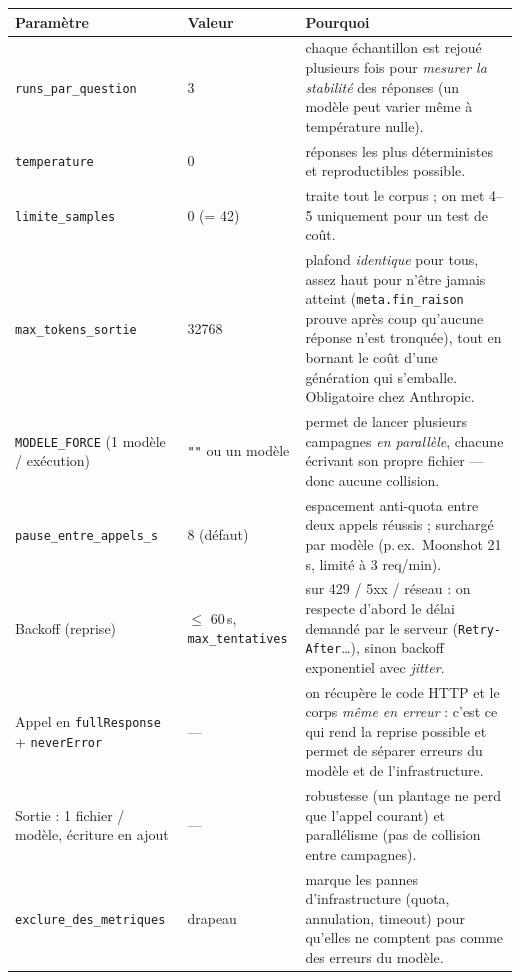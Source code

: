 \begin{center}\small
\setlength{\tabcolsep}{4pt}\renewcommand{\arraystretch}{1.12}\begin{tabular}{@{}p{4.2cm}p{2.0cm}p{9.3cm}@{}}
\toprule
\textbf{Paramètre} & \textbf{Valeur} & \textbf{Pourquoi} \\
\midrule
\lstinline|runs_par_question| & 3 & chaque échantillon est rejoué plusieurs fois pour \emph{mesurer la stabilité} des réponses (un modèle peut varier même à température nulle). \\
\lstinline|temperature| & 0 & réponses les plus déterministes et reproductibles possible. \\
\lstinline|limite_samples| & 0 (= 42) & traite tout le corpus ; on met 4–5 uniquement pour un test de coût. \\
\lstinline|max_tokens_sortie| & 32768 & plafond \emph{identique} pour tous, assez haut pour n'être jamais atteint (\texttt{meta.fin\_raison} prouve après coup qu'aucune réponse n'est tronquée), tout en bornant le coût d'une génération qui s'emballe. Obligatoire chez Anthropic. \\
\lstinline|MODELE_FORCE| (1 modèle / exécution) & \texttt{""} ou un modèle & permet de lancer plusieurs campagnes \emph{en parallèle}, chacune écrivant son propre fichier — donc aucune collision. \\
\lstinline|pause_entre_appels_s| & 8 (défaut) & espacement anti-quota entre deux appels réussis ; surchargé par modèle (p.\,ex.\ Moonshot 21\,s, limité à 3 req/min). \\
Backoff (reprise) & $\le$ 60\,s, \lstinline|max_tentatives| & sur 429 / 5xx / réseau : on respecte d'abord le délai demandé par le serveur (\texttt{Retry-After}\dots), sinon backoff exponentiel avec \emph{jitter}. \\
Appel en \texttt{fullResponse} + \texttt{neverError} & — & on récupère le code HTTP et le corps \emph{même en erreur} : c'est ce qui rend la reprise possible et permet de séparer erreurs du modèle et de l'infrastructure. \\
Sortie : 1 fichier / modèle, écriture en ajout & — & robustesse (un plantage ne perd que l'appel courant) et parallélisme (pas de collision entre campagnes). \\
\lstinline|exclure_des_metriques| & drapeau & marque les pannes d'infrastructure (quota, annulation, timeout) pour qu'elles ne comptent pas comme des erreurs du modèle. \\
\bottomrule
\end{tabular}
\end{center}

